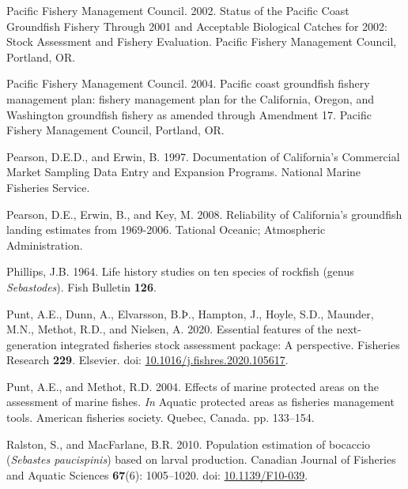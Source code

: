 \documentclass[11pt,
  english,
  a4paper,
]{article}
\newlength{\cslhangindent}
\newenvironment{CSLReferences}[2] %
 {%
  \setlength{\parindent}{0pt}
  \ifodd #1 \everypar{\setlength{\hangindent}{\cslhangindent}}\ignorespaces\fi
  \ifnum #2 > 0
  \setlength{\parskip}{#2\baselineskip}
  \fi
 }%
 {}
\begin{document}
\begin{CSLReferences}{1}{0}
\leavevmode{}%
Pacific Fishery Management Council. 2002. {Status of the Pacific Coast Groundfish Fishery Through 2001 and Acceptable Biological Catches for 2002: Stock Assessment and Fishery Evaluation.} Pacific Fishery Management Council, Portland, OR.

\leavevmode{}%
Pacific Fishery Management Council. 2004. {Pacific coast groundfish fishery management plan: fishery management plan for the California, Oregon, and Washington groundfish fishery as amended through Amendment 17}. Pacific Fishery Management Council, Portland, OR.

\leavevmode{}%
Pearson, D.E.D., and Erwin, B. 1997. {Documentation of California's Commercial Market Sampling Data Entry and Expansion Programs}. National Marine Fisheries Service.

\leavevmode{}%
Pearson, D.E., Erwin, B., and Key, M. 2008. {Reliability of California's groundfish landing estimates from 1969-2006}. Tational Oceanic; Atmospheric Administration.

\leavevmode{}%
Phillips, J.B. 1964. {Life history studies on ten species of rockfish (genus \emph{Sebastodes})}. Fish Bulletin \textbf{126}.

\leavevmode{}%
Punt, A.E., Dunn, A., Elvarsson, B.Þ., Hampton, J., Hoyle, S.D., Maunder, M.N., Methot, R.D., and Nielsen, A. 2020. {Essential features of the next-generation integrated fisheries stock assessment package: A perspective}. Fisheries Research \textbf{229}. Elsevier. doi: \href{https://doi.org/10.1016/j.fishres.2020.105617}{10.1016/j.fishres.2020.105617}.

\leavevmode{}%
Punt, A.E., and Methot, R.D. 2004. {Effects of marine protected areas on the assessment of marine fishes}. \emph{In} Aquatic protected areas as fisheries management tools. American fisheries society. Quebec, Canada. pp. 133--154.

\leavevmode{}%
Ralston, S., and MacFarlane, B.R. 2010. {Population estimation of bocaccio (\emph{Sebastes paucispinis}) based on larval production}. Canadian Journal of Fisheries and Aquatic Sciences \textbf{67}(6): 1005--1020. doi: \href{https://doi.org/10.1139/F10-039}{10.1139/F10-039}.


\end{CSLReferences}
\end{document}
